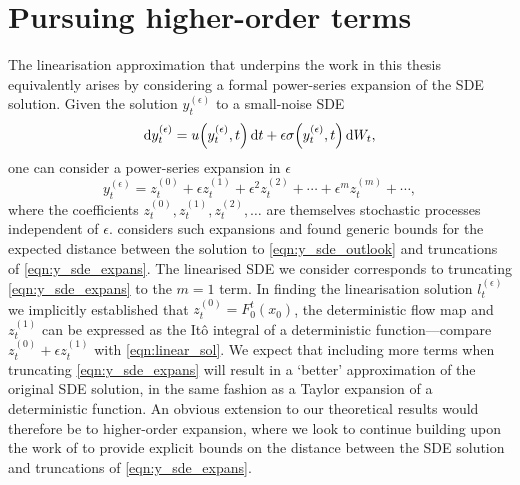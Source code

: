\section{Pursuing higher-order terms}\label{sec:disc_higher}
The linearisation approximation that underpins the work in this thesis equivalently arises by considering a formal power-series expansion of the SDE solution.
Given the solution \(y_t^{(\epsilon)}\) to a small-noise SDE
\begin{equation}\label{eqn:y_sde_outlook}
	\dif y_t^{(\epsilon)} = u\!\left(y_t^{(\epsilon)}, t\right)\dif t + \epsilon \sigma\!\left(y_t^{(\epsilon)}, t\right)\dif W_t,
\end{equation}
one can consider a power-series expansion in \(\epsilon\)
\begin{equation}\label{eqn:y_sde_expans}
	y_t^{(\epsilon)} = z_t^{(0)} + \epsilon z_t^{(1)} + \epsilon^2 z_t^{(2)} + \dotsb + \epsilon^m z_t^{(m)} + \dotsb,
\end{equation}
where the coefficients \(z_t^{(0)}, z_t^{(1)}, z_t^{(2)}, \dotsc\) are themselves stochastic processes independent of \(\epsilon\).
\citet{Blagoveshchenskii_1962_DiffusionProcessesDepending} considers such expansions and found generic bounds for the expected distance between the solution to \cref{eqn:y_sde_outlook} and truncations of \cref{eqn:y_sde_expans}.
The linearised SDE we consider corresponds to truncating \cref{eqn:y_sde_expans} to the \(m = 1\) term.
In finding the linearisation solution \(l_t^{(\epsilon)}\) we implicitly established that \(z_t^{(0)} = F_0^t\!\left(x_0\right)\), the deterministic flow map and \(z_t^{(1)}\) can be expressed as the It\^o integral of a deterministic function---compare \(z_t^{(0)} + \epsilon z_t^{(1)}\) with \cref{eqn:linear_sol}.
We expect that including more terms when truncating \cref{eqn:y_sde_expans} will result in a `better' approximation of the original SDE solution, in the same fashion as a Taylor expansion of a deterministic function.
An obvious extension to our theoretical results would therefore be to higher-order expansion, where we look to continue building upon the work of \citet{Blagoveshchenskii_1962_DiffusionProcessesDepending} to provide explicit bounds on the distance between the SDE solution and truncations of \cref{eqn:y_sde_expans}.

